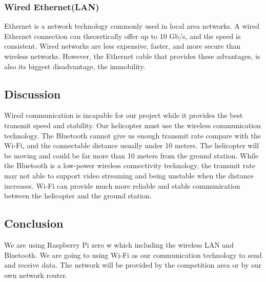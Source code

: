\documentclass[letterpaper, 10, draftclsnofoot, onecolumn,compsoc]{IEEEtran}
\begin{document}
\subsubsection{Wired Ethernet(LAN)}
Ethernet is a network technology commonly used in local area networks. A wired Ethernet connection can theoretically offer up to 10 Gb/s, and the speed is consistent. Wired networks are less expensive, faster, and more secure than wireless networks. However, the Ethernet cable that provides these advantages, is also its biggest disadvantage, the immobility.

\subsection{Discussion}
Wired communication is incapable for our project while it provides the best transmit speed and stability. Our helicopter must use the wireless communication technology. The Bluetooth cannot give us enough transmit rate compare with the Wi-Fi, and the connectable distance usually under 10 meters. The helicopter will be moving and could be far more than 10 meters from the ground station. While the Bluetooth is a low-power wireless connectivity technology\cite{r8}, the transmit rate may not able to support video streaming and being unstable when the distance increases. Wi-Fi can provide much more reliable and stable communication between the helicopter and the ground station.

\subsection{Conclusion}
We are using Raspberry Pi zero w which including the wireless LAN and Bluetooth. We are going to using Wi-Fi as our communication technology to send and receive data. The network will be provided by the competition area or by our own network router.

\vspace{2mm}
\raggedright


\end{document}
